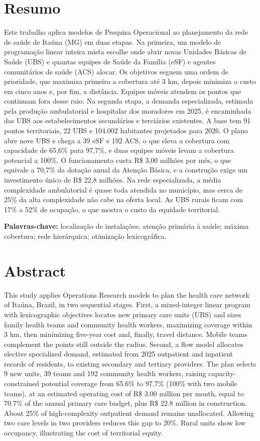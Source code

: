 \documentclass[12pt,a4paper,oneside]{report}
\begin{document}
\chapter*{Resumo}
Este trabalho aplica modelos de Pesquisa Operacional ao planejamento da rede de saúde de Itaúna (MG) em
duas etapas. Na primeira, um modelo de programação linear inteira mista escolhe onde abrir novas Unidades
Básicas de Saúde (UBS) e quantas equipes de Saúde da Família (eSF) e agentes comunitários de saúde (ACS)
alocar. Os objetivos seguem uma ordem de prioridade, que maximiza primeiro a cobertura até 3 km, depois
minimiza o custo em cinco anos e, por fim, a distância. Equipes móveis atendem os pontos que continuam
fora desse raio. Na segunda etapa, a demanda especializada, estimada pela produção ambulatorial e
hospitalar dos moradores em 2025, é encaminhada das UBS aos estabelecimentos secundários e terciários
existentes. A base tem 91 pontos territoriais, 22 UBS e 104.002 habitantes projetados para 2026. O plano
abre nove UBS e chega a 39 eSF e 192 ACS, o que eleva a cobertura com capacidade de 65,6\% para 97,7\%, e
duas equipes móveis levam a cobertura potencial a 100\%. O funcionamento custa R\$ 3,00 milhões por mês, o que equivale a 70,7\% da dotação anual da Atenção
Básica, e a construção exige um investimento único de R\$ 22,8 milhões. Na rede especializada, a média
complexidade ambulatorial é quase toda atendida no município, mas cerca de 25\% da alta complexidade não
cabe na oferta local. As UBS rurais ficam com 17\% a 52\% de ocupação, o que mostra o custo
da equidade territorial.

\noindent\textbf{Palavras-chave:} localização de instalações; atenção primária à saúde; máxima cobertura;
rede hierárquica; otimização lexicográfica.

\chapter*{Abstract}
This study applies Operations Research models to plan the health care network of Itaúna, Brazil, in two
sequential stages. First, a mixed-integer linear program with lexicographic objectives locates new
primary care units (UBS) and sizes family health teams and community health workers, maximizing
coverage within 3 km, then minimizing five-year cost and, finally, travel distance. Mobile teams
complement the points still outside the radius. Second, a flow model allocates elective specialized
demand, estimated from 2025 outpatient and inpatient records of residents, to existing secondary and
tertiary providers. The plan selects 9 new units, 39 teams and 192 community health workers, raising
capacity-constrained potential coverage from 65.6\% to 97.7\% (100\% with two mobile teams), at an estimated operating cost of R\$ 3.00 million per month, equal to 70.7\% of the annual primary care budget, plus R\$ 22.8 million in construction. About 25\% of
high-complexity outpatient demand remains unallocated. Allowing two care levels in two providers
reduces this gap to 20\%. Rural units show low occupancy, illustrating the cost of territorial equity.
\end{document}
